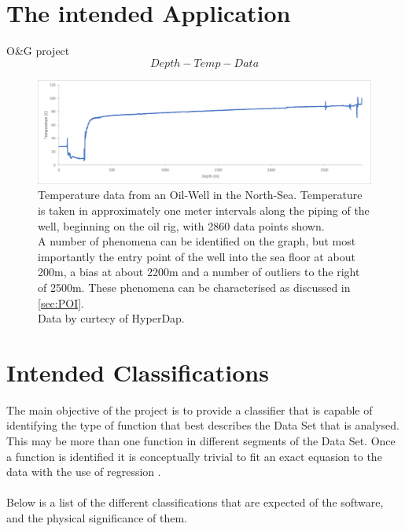 \documentclass[main.tex]{subfiles}
\begin{document}
    
  \section{The intended Application}
    
    O\&G project
    \[Depth-Temp-Data\]
    \begin{figure}[h]
      \centering
      \includegraphics[width=\linewidth]{figures/wellData}
      \caption{Temperature data from an Oil-Well in the North-Sea. Temperature is taken in approximately one meter intervals along the piping of the well, beginning on the oil rig, with 2860 data points shown. \\
      A number of phenomena can be identified on the graph, but most importantly the entry point of the well into the sea floor at about 200m, a bias at about 2200m and a number of outliers to the right of 2500m. These phenomena can be characterised as discussed in \cref{sec:POI}. \\
      Data by curtecy of HyperDap.}
      \label{fig:well}
    \end{figure}
    
  \section{Intended Classifications}
    
    The main objective of the project is to provide a classifier that is capable of identifying the type of function that best describes the Data Set that is analysed. This may be more than one function in different segments of the Data Set. Once a function is identified it is conceptually trivial to fit an exact equasion to the data with the use of regression \cite{}. 
    \\\\
    Below is a list of the different classifications that are expected of the software, and the physical significance of them.
    
\end{document}
